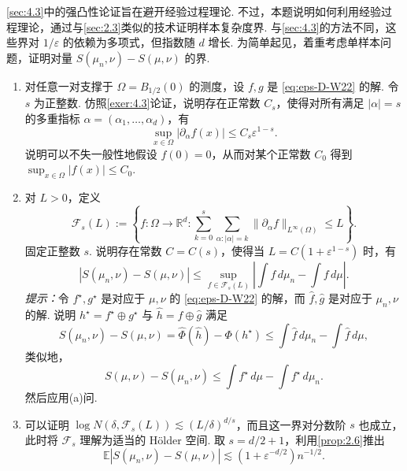 \begin{exercise}\label{exer:4.7}
\autoref{sec:4.3}中的强凸性论证旨在避开经验过程理论. 不过，本题说明如何利用经验过程理论，通过与\autoref{sec:2.3}类似的技术证明样本复杂度界. 与\autoref{sec:4.3}的方法不同，这些界对 $1/\varepsilon$ 的依赖为多项式，但指数随 $d$ 增长. 为简单起见，着重考虑单样本问题，证明对量 $S(\mu_n,\nu)-S(\mu,\nu)$ 的界.
\begin{enumerate}\renewcommand{\labelenumi}{(\alph{enumi})}
\item 对任意一对支撑于 $\Omega=B_{1/2}(0)$ 的测度，设 $f,g$ 是 \eqref{eq:eps-D-W22} 的解. 令 $s$ 为正整数. 仿照\autoref{exer:4.3}论证，说明存在正常数 $C_s$，使得对所有满足 $|\alpha|=s$ 的多重指标 $\alpha=(\alpha_1,\ldots,\alpha_d)$，有
$$\sup_{x\in\Omega}|\partial_\alpha f(x)|\le C_s\varepsilon^{1-s}.$$
说明可以不失一般性地假设 $f(0)=0$，从而对某个正常数 $C_0$ 得到 $\sup_{x\in\Omega}|f(x)|\le C_0$.
\item 对 $L>0$，定义
$$\mathcal F_s(L):=\left\{f:\Omega\to\mathbb R^d:
\sum_{k=0}^s\sum_{\alpha:|\alpha|=k}\|\partial_\alpha f\|_{L^\infty(\Omega)}\le L\right\}.$$
固定正整数 $s$. 说明存在常数 $C=C(s)$，使得当 $L=C(1+\varepsilon^{1-s})$ 时，有
$$|S(\mu_n,\nu)-S(\mu,\nu)|
\le\sup_{f\in\mathcal F_s(L)}\left|\int f\,d\mu_n-\int f\,d\mu\right|.$$
\emph{提示：}令 $f^\star,g^\star$ 是对应于 $\mu,\nu$ 的 \eqref{eq:eps-D-W22} 的解，而 $\widehat f,\widehat g$ 是对应于 $\mu_n,\nu$ 的解. 说明 $h^\star=f^\star\oplus g^\star$ 与 $\widehat h=\widehat f\oplus\widehat g$ 满足
$$S(\mu_n,\nu)-S(\mu,\nu)=\widehat\Phi(\widehat h)-\Phi(h^\star)
\le\int\widehat f\,d\mu_n-\int\widehat f\,d\mu,$$
类似地，
$$S(\mu,\nu)-S(\mu_n,\nu)\le\int f^\star\,d\mu-\int f^\star\,d\mu_n.$$
然后应用(a)问.
\item 可以证明 $\log N(\delta,\mathcal F_s(L))\lesssim(L/\delta)^{d/s}$，而且这一界对分数阶 $s$ 也成立，此时将 $\mathcal F_s$ 理解为适当的 H\"older 空间. 取 $s=d/2+1$，利用\autoref{prop:2.6}推出
$$\mathbb E|S(\mu_n,\nu)-S(\mu,\nu)|\lesssim(1+\varepsilon^{-d/2})n^{-1/2}.$$
\end{enumerate}
\end{exercise}

